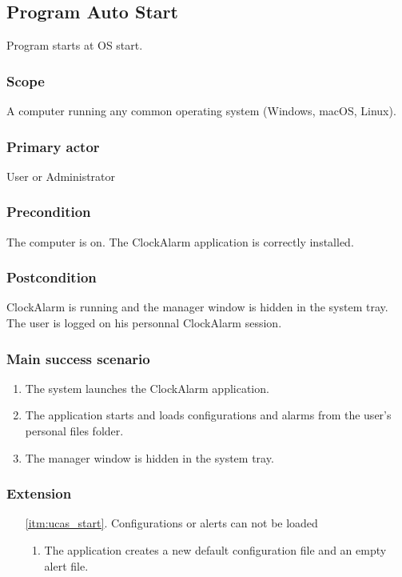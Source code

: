 \subsection{Program Auto Start}\label{subsec:usecase_auto_start}

Program starts at OS start.

\subsubsection{Scope}

A computer running any common operating system (Windows, macOS, Linux).

\subsubsection{Primary actor}

User or Administrator

\subsubsection{Precondition}
The computer is on. The ClockAlarm application is correctly installed.

\subsubsection{Postcondition}

ClockAlarm is running and the manager window is hidden in the system tray. The
user is logged on his personnal ClockAlarm session.

\subsubsection{Main success scenario}
\begin{enumerate}
    \item The system launches the ClockAlarm application.
    \item\label{itm:ucas_start} The application starts and loads
        configurations and alarms from the user's personal files folder.
    \item The manager window is hidden in the system tray.
\end{enumerate}

\subsubsection{Extension}
\begin{enumerate}
    \item[\ref{itm:ucas_start}.] Configurations or alerts can not be loaded
    \begin{enumerate}[i]
        \item The application creates a new default configuration file and an
            empty alert file.
    \end{enumerate}
\end{enumerate}
